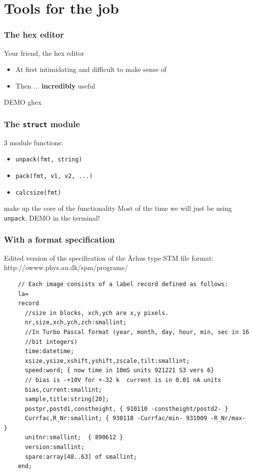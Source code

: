 \documentclass{beamer}
\begin{document}
\section{Tools for the job}
\begin{frame}
  \frametitle{The hex editor}
  \begin{block}{Your friend, the hex editor}
    \begin{itemize}
    \item At first intimidating and difficult to make sense of
    \item Then ... \textbf{incredibly} useful
    \end{itemize}  
  \end{block}
  \huge
  \vspace{2cm}
  DEMO ghex
\end{frame}

\begin{frame}
  \frametitle{The \texttt{struct} module}
  3 module functions:\newline
  \begin{itemize}
  \item \texttt{unpack(fmt, string)}
  \item \texttt{pack(fmt, v1, v2, ...)}
  \item \texttt{calcsize(fmt)}
  \end{itemize}
  make up the core of the functionality\newline
  \newline
  Most of the time we will just be using \texttt{unpack}.
  \vspace{1cm}
  \huge\newline
  DEMO in the terminal!
\end{frame}

\begin{frame}[fragile]
  \frametitle{With a format specification}
  Edited version of the specification of the \AA{}rhus type STM file format: http://owww.phys.au.dk/spm/programs/
  \footnotesize
  \begin{verbatim}
    // Each image consists of a label record defined as follows:
    la=
    record
      //size in blocks, xch,ych are x,y pixels.
      nr,size,xch,ych,zch:smallint;
      //In Turbo Pascal format (year, month, day, hour, min, sec in 16
      //bit integers)
      time:datetime;
      xsize,ysize,xshift,yshift,zscale,tilt:smallint;
      speed:word; { now time in 10mS units 921221 S3 vers 6}
      // bias is -+10V for +-32 k  current is in 0.01 nA units
      bias,current:smallint;
      sample,title:string[20];
      postpr,postd1,constheight, { 910110 -constheight/postd2- }
      Currfac,R_Nr:smallint; { 930118 -Currfac/min- 931009 -R_Nr/max- }
      unitnr:smallint;  { 890612 }
      version:smallint;
      spare:array[48..63] of smallint;
    end;
  \end{verbatim}
\end{frame}
\end{document}
